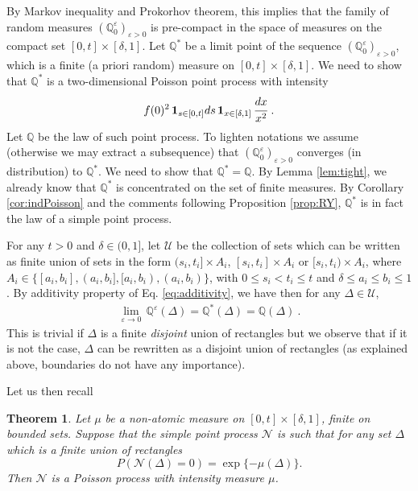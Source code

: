 \documentclass[reqno, 12pt, a4paper]{amsart}
\theoremstyle{plain}
\newtheorem{theorem}{Theorem}[section]
\theoremstyle{definition}
\begin{document}
By Markov inequality and Prokorhov theorem, this implies that the family of random measures $(\mathbb Q_0^\varepsilon)_{\varepsilon>0}$ is pre-compact in the space of measures on the compact set $[0,t] \times [\delta,1]$. Let $\mathbb Q^*$ be a limit point of the sequence $(\mathbb Q_0^\varepsilon)_{\varepsilon>0}$, which is a finite (a priori random) measure on $[0,t] \times [\delta,1]$. We need to show that $\mathbb Q^*$ is a two-dimensional Poisson point process with intensity 
\begin{equation}
\begin{split}
f(0)^2 \,  {\bf 1}_{s \in [0,t]} ds  \, {\bf 1}_{x \in [\delta,1]} \, \cfrac{dx}{x^2} \ .
\end{split}
\end{equation}
Let $\mathbb Q$ be the law of such point process. To lighten notations we assume (otherwise we may extract a subsequence) that  $(\mathbb Q_0^\varepsilon)_{\varepsilon>0}$ converges (in distribution) to $\mathbb Q^*$. We need to show that $\mathbb Q^*=\mathbb Q$. By Lemma \ref{lem:tight}, we already know that $\mathbb Q^*$ is concentrated on the set of finite measures. By Corollary \ref{cor:indPoisson} and the comments following Proposition \ref{prop:RY}, $\mathbb Q^*$ is in fact the law of a simple point process.

\medskip

For any $t>0$ and $\delta \in (0,1]$, let $\mathcal U$ be the collection of sets which can be written as finite union of sets in the form $(s_i, t_i] \times A_i$, $[s_i,t_i]\times A_i$ or  $[s_i,t_i)\times A_i$, where $A_i \in \{ [a_i, b_i], (a_i, b_i], [a_i, b_i), (a_i, b_i) \}$, with $0 \le s_i <  t_i \le t$ and $\delta \le a_i \le b_i \le 1$.  By additivity property of Eq. \eqref{eq:additivity}, we have then for any $\Delta \in \mathcal U$,
\begin{equation}
\begin{split}
\lim_{\varepsilon \to 0} \, \mathbb Q^\varepsilon (\Delta) = \mathbb Q^* (\Delta) = \mathbb Q(\Delta) \ .
\end{split}
\end{equation}
This is trivial if $\Delta$ is a finite \textit{disjoint} union of rectangles but we observe that if it is not the case, $\Delta$ can be rewritten as a disjoint union of rectangles (as explained above, boundaries do not have any importance). 

\medskip

Let us then recall 

\begin{theorem}\cite[R\'{e}nyi theorem]{DV02} 
\label{thm:renyi}
Let $\mu$ be a non-atomic measure on $[0,t]\times[\delta,1]$, finite on bounded sets. Suppose that the simple point process $\mathcal N$ is such that for any set $\Delta$ which is a finite union of rectangles
\[
P(\mathcal N(\Delta) = 0) = \exp\{-\mu(\Delta)\}.
\]
Then $\mathcal N$ is a Poisson process with intensity measure $\mu$.
\end{theorem}
\end{document}
